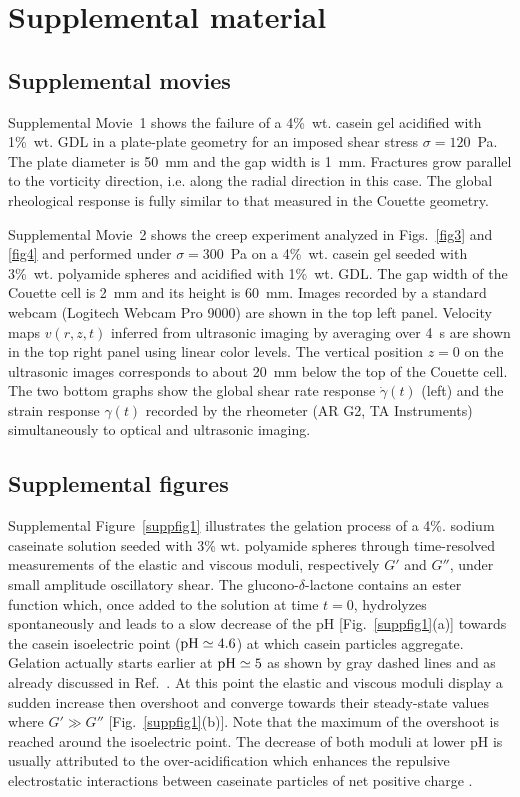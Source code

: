 \documentclass[twocolumn,superscriptaddress,showpacs,preprintnumbers,amsmath,amssymb,prl]{revtex4}
\newcommand\gp{\dot\gamma}
\begin{document}
\clearpage
\newpage
\setcounter{figure}{0}

\section*{\large Supplemental material}

\subsection*{Supplemental movies}

Supplemental Movie~1 shows the failure of a 4\%~wt. casein gel acidified with 1\%~wt. GDL in a plate-plate geometry for an imposed shear stress $\sigma=120$~Pa. The plate diameter is 50~mm and the gap width is 1~mm. Fractures grow parallel to the vorticity direction, i.e. along the radial direction in this case. The global rheological response is fully similar to that measured in the Couette geometry.

Supplemental Movie~2 shows the creep experiment analyzed in Figs.~\ref{fig3} and \ref{fig4} and performed under $\sigma=300$~Pa on a 4\%~wt. casein gel seeded with 3\%~wt. polyamide spheres and acidified with 1\%~wt. GDL. The gap width of the Couette cell is 2~mm and its height is 60~mm. Images recorded by a standard webcam (Logitech Webcam Pro 9000) are shown in the top left panel. Velocity maps $v(r,z,t)$ inferred from ultrasonic imaging by averaging over 4~s are shown in the top right panel using linear color levels. The vertical position $z=0$ on the ultrasonic images corresponds to about 20~mm below the top of the Couette cell. The two bottom graphs show the global shear rate response $\gp(t)$ (left) and the strain response $\gamma(t)$ recorded by the rheometer (AR G2, TA Instruments) simultaneously to optical and ultrasonic imaging.

\subsection*{Supplemental figures} 

Supplemental Figure~\ref{suppfig1} illustrates the gelation process of a 4\%. sodium caseinate solution seeded with 3\% wt. polyamide spheres through time-resolved measurements of the elastic and viscous moduli, respectively $G'$ and $G''$, under small amplitude oscillatory shear. The glucono-$\delta$-lactone contains an ester function which, once added to the solution at time $t=0$, hydrolyzes spontaneously and leads to a slow decrease of the pH [Fig.~\ref{suppfig1}(a)] towards the casein isoelectric point (${\rm pH}\simeq 4.6$) at which casein particles aggregate. Gelation actually starts earlier at ${\rm pH}\simeq 5$ as shown by gray dashed lines and as already discussed in Ref.~\cite{Lucey:1998supp}. At this point the elastic and viscous moduli display a sudden increase then overshoot and converge towards their steady-state values where $G'\gg G''$ [Fig.~\ref{suppfig1}(b)]. Note that the maximum of the overshoot is reached around the isoelectric point. The decrease of both moduli at lower pH is usually attributed to the over-acidification which enhances the repulsive electrostatic interactions between caseinate particles of net positive charge \cite{Dickinson:2002supp}.   
\end{document}
